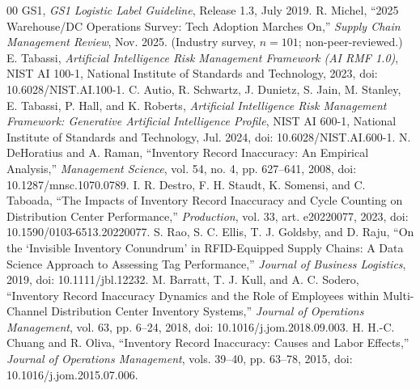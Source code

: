 \documentclass[conference]{IEEEtran}
\begin{document}
\begin{thebibliography}{00}
 GS1, \textit{GS1 Logistic Label Guideline}, Release 1.3, July 2019.
 R. Michel, ``2025 Warehouse/DC Operations Survey: Tech Adoption Marches On,'' \textit{Supply Chain Management Review}, Nov. 2025. (Industry survey, $n=101$; non-peer-reviewed.)
 E. Tabassi, \textit{Artificial Intelligence Risk Management Framework (AI RMF 1.0)}, NIST AI 100-1, National Institute of Standards and Technology, 2023, doi: 10.6028/NIST.AI.100-1.
 C. Autio, R. Schwartz, J. Dunietz, S. Jain, M. Stanley, E. Tabassi, P. Hall, and K. Roberts, \textit{Artificial Intelligence Risk Management Framework: Generative Artificial Intelligence Profile}, NIST AI 600-1, National Institute of Standards and Technology, Jul. 2024, doi: 10.6028/NIST.AI.600-1.
 N. DeHoratius and A. Raman, ``Inventory Record Inaccuracy: An Empirical Analysis,'' \textit{Management Science}, vol. 54, no. 4, pp. 627--641, 2008, doi: 10.1287/mnsc.1070.0789.
 I. R. Destro, F. H. Staudt, K. Somensi, and C. Taboada, ``The Impacts of Inventory Record Inaccuracy and Cycle Counting on Distribution Center Performance,'' \textit{Production}, vol. 33, art. e20220077, 2023, doi: 10.1590/0103-6513.20220077.
 S. Rao, S. C. Ellis, T. J. Goldsby, and D. Raju, ``On the `Invisible Inventory Conundrum' in RFID-Equipped Supply Chains: A Data Science Approach to Assessing Tag Performance,'' \textit{Journal of Business Logistics}, 2019, doi: 10.1111/jbl.12232.
 M. Barratt, T. J. Kull, and A. C. Sodero, ``Inventory Record Inaccuracy Dynamics and the Role of Employees within Multi-Channel Distribution Center Inventory Systems,'' \textit{Journal of Operations Management}, vol. 63, pp. 6--24, 2018, doi: 10.1016/j.jom.2018.09.003.
 H. H.-C. Chuang and R. Oliva, ``Inventory Record Inaccuracy: Causes and Labor Effects,'' \textit{Journal of Operations Management}, vols. 39--40, pp. 63--78, 2015, doi: 10.1016/j.jom.2015.07.006.
\end{thebibliography}
\end{document}
